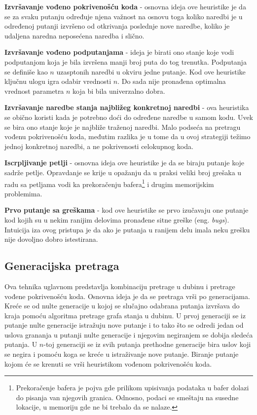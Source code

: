 \documentclass[12pt,oneside]{memoir}
\begin{document}
\begin{description}
    \item \textbf{Izvršavanje vođeno pokrivenošću koda} - osnovna ideja ove heuristike je da se za svaku putanju određuje njena važnost na osnovu toga koliko naredbi je u određenoj putanji izvršeno od otkrivanja poslednje nove naredbe, koliko je udaljena naredna neposećena naredba i slično.
    
    \item \textbf{Izvršavanje vođeno podputanjama} - ideja je birati ono stanje koje vodi podputanjom koja je bila izvršena manji broj puta do tog trenutka. Podputanja se definiše kao $n$ uzasptonih naredbi u okviru jedne putanje. Kod ove heuristike ključnu ulogu igra odabir vrednosti $n$. Do sada nije pronađena optimalna vrednost parametra $n$ koja bi bila univerzalno dobra.
    
    \item \textbf{Izvršavanje naredbe stanja najbližeg konkretnoj naredbi} - ova heuristika se obično koristi kada je potrebno doći do određene naredbe u samom kodu. Uvek se bira ono stanje koje je najbliže traženoj naredbi. Malo podseća na pretragu vođenu pokrivenošću koda, međutim razlika je u tome da u ovoj strategiji težimo jednoj konkretnoj naredbi, a ne pokrivenosti celokupnog koda.
    
    \item \textbf{Iscrpljivanje petlji} - osnovna ideja ove heuristike je da se biraju putanje koje sadrže petlje. Opravdanje se krije u opažanju da u praksi veliki broj grešaka u radu sa petljama vodi ka prekoračenju bafera\footnote[4]{Prekoračenje bafera je pojva gde prilikom upisivanja podataka u bafer dolazi do pisanja van njegovih granica. Odnosno, podaci se smeštaju na susedne lokacije, u memoriju gde ne bi trebalo da se nalaze.} i drugim memorijskim problemima.
    
    \item \textbf{Prvo putanje sa greškama} - kod ove heuristike se prvo izučavaju one putanje kod kojih su u nekim ranijim delovima pronađene sitne greške (eng. \textit{bugs}). Intuicija iza ovog pristupa je da ako je putanja u ranijem delu imala neku grešku nije dovoljno dobro istestirana.
\end{description}

\subsection{Generacijska pretraga} 
Ova tehnika uglavnom predstavlja kombinaciju pretrage u dubinu i pretrage vođene pokrivenošću koda. Osnovna ideja je da se pretraga vrši po generacijama. Kreće se od nulte generacije u kojoj se slučajno odabrana putanja izvršava do kraja pomoću algoritma pretrage grafa stanja u dubinu. U prvoj generaciji se iz putanje nulte generacije istražuju nove putanje i to tako što se odredi jedan od uslova grananja u putanji nulte generacije i njegovim negiranjem se dobija sledeća putanja. U $n$-toj generaciji se iz svih putanja prethodne generacije bira uslov koji se negira i pomoću koga se kreće u istraživanje nove putanje. Biranje putanje kojom će se krenuti se vrši heuristikom vođenom pokrivenošću koda.
\bigskip
\end{document}
